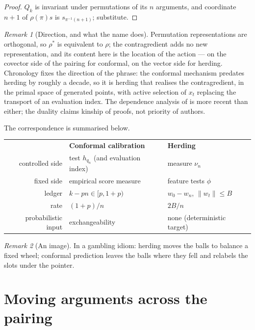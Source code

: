 \documentclass[11pt]{article}
\theoremstyle{remark}
\newtheorem{remark}{Remark}
\begin{document}
\begin{proof}
$Q_k$ is invariant under permutations of its $n$ arguments, and coordinate $n+1$ of $\rho(\pi)s$
is $s_{\pi^{-1}(n+1)}$; substitute.
\end{proof}

\begin{remark}[Direction, and what the name does]\label{rmk:direction}
Permutation representations are orthogonal, so $\rho^{*}$ is equivalent to $\rho$; the
contragredient adds no new representation, and its content here is the location of the action ---
on the covector side of the pairing for conformal, on the vector side for herding. Chronology
fixes the direction of the phrase: the conformal mechanism predates herding by roughly a decade,
so it is herding that realises the contragredient, in the primal space of generated points, with
active selection of $x_t$ replacing the transport of an evaluation index. The dependence
analysis of \citet{barberpananjady2026} is more recent than either; the duality claims kinship of
proofs, not priority of authors.
\end{remark}

The correspondence is summarised below.

\begin{center}
\begin{tabular}{r@{\qquad}l@{\qquad}l}
 & \textbf{Conformal calibration} & \textbf{Herding} \\[2pt]
controlled side & test $h_{q_n}$ (and evaluation index) & measure $\nu_n$ \\
fixed side & empirical score measure & feature tests $\phi$ \\
ledger & $k-pn\in[p,1+p)$ & $w_0-w_n$, $\|w_t\|\le B$ \\
rate & $(1+p)/n$ & $2B/n$ \\
probabilistic input & exchangeability & none (deterministic target) \\
\end{tabular}
\end{center}

\begin{remark}[An image]
In a gambling idiom: herding moves the balls to balance a fixed wheel; conformal prediction
leaves the balls where they fell and relabels the slots under the pointer.
\end{remark}

\section{Moving arguments across the pairing}\label{sec:transfer}
\end{document}
